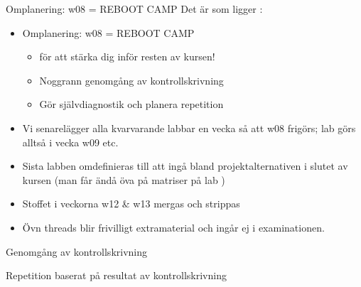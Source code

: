 \begin{Slide}{Omplanering: w08 = REBOOT CAMP}
Det är  som ligger : \\
\begin{itemize}
\item Omplanering: w08 = REBOOT CAMP
\begin{itemize}
\item {} för att stärka dig inför resten av kursen!
\item Noggrann genomgång av kontrollskrivning
\item Gör självdiagnostik och planera repetition
\end{itemize}
\item Vi senarelägger alla kvarvarande labbar en vecka så att w08 frigörs;
 lab  görs alltså i vecka w09 etc.

\item Sista labben  omdefinieras till att ingå bland projektalternativen i slutet av kursen (man får ändå öva på matriser på lab )

\item Stoffet i veckorna w12 \& w13 mergas och strippas

\item Övn threads blir frivilligt extramaterial och ingår ej i examinationen.

\end{itemize}
\end{Slide}

\begin{Slide}{Genomgång av kontrollskrivning}
\end{Slide}


\begin{Slide}{Repetition baserat på resultat av kontrollskrivning}
\end{Slide}


\fi












